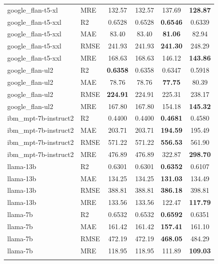 \begin{table}[t]
\begin{tabular}{llcccc}
google\_flan-t5-xl & MRE & 132.57 & 132.57 & 137.69 & \textbf{128.87} \\
\addlinespace
google\_flan-t5-xxl & R2 & 0.6528 & 0.6528 & \textbf{0.6546} & 0.6339 \\
google\_flan-t5-xxl & MAE & 83.40 & 83.40 & \textbf{81.06} & 82.94 \\
google\_flan-t5-xxl & RMSE & 241.93 & 241.93 & \textbf{241.30} & 248.29 \\
google\_flan-t5-xxl & MRE & 168.63 & 168.63 & 146.12 & \textbf{143.86} \\
\addlinespace
google\_flan-ul2 & R2 & \textbf{0.6358} & 0.6358 & 0.6347 & 0.5918 \\
google\_flan-ul2 & MAE & 78.76 & 78.76 & \textbf{77.75} & 80.39 \\
google\_flan-ul2 & RMSE & \textbf{224.91} & 224.91 & 225.31 & 238.17 \\
google\_flan-ul2 & MRE & 167.80 & 167.80 & 154.18 & \textbf{145.32} \\
\addlinespace
ibm\_mpt-7b-instruct2 & R2 & 0.4400 & 0.4400 & \textbf{0.4681} & 0.4580 \\
ibm\_mpt-7b-instruct2 & MAE & 203.71 & 203.71 & \textbf{194.59} & 195.49 \\
ibm\_mpt-7b-instruct2 & RMSE & 571.22 & 571.22 & \textbf{556.53} & 561.90 \\
ibm\_mpt-7b-instruct2 & MRE & 476.89 & 476.89 & 322.87 & \textbf{298.70} \\
\addlinespace
llama-13b & R2 & 0.6301 & 0.6301 & \textbf{0.6352} & 0.6107 \\
llama-13b & MAE & 134.25 & 134.25 & \textbf{131.03} & 134.49 \\
llama-13b & RMSE & 388.81 & 388.81 & \textbf{386.18} & 398.81 \\
llama-13b & MRE & 133.56 & 133.56 & 122.47 & \textbf{117.79} \\
\addlinespace
llama-7b & R2 & 0.6532 & 0.6532 & \textbf{0.6592} & 0.6351 \\
llama-7b & MAE & 161.42 & 161.42 & \textbf{157.41} & 161.10 \\
llama-7b & RMSE & 472.19 & 472.19 & \textbf{468.05} & 484.29 \\
llama-7b & MRE & 118.95 & 118.95 & 111.89 & \textbf{109.03} \\
\addlinespace
\bottomrule
\end{tabular}
\end{table}